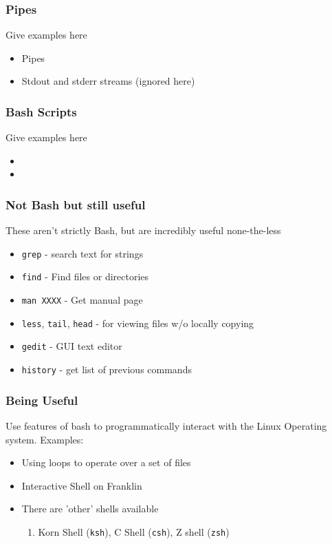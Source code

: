 \documentclass{beamer}
\newcommand{\code}[1]{\colorbox{codegray}{\texttt{#1}}}
\begin{document}
\begin{frame}
\frametitle{Pipes}
Give examples here
\begin{itemize}
    \item Pipes 
    \pause
    \item Stdout and stderr streams (ignored here)
    \pause
\end{itemize}
\end{frame}


\begin{frame}
\frametitle{Bash Scripts}
Give examples here
\begin{itemize}
    \item 
    \pause
    \item
    \pause
\end{itemize}
\end{frame}


\begin{frame}
\frametitle{Not Bash but still useful}
These aren't strictly Bash, but are incredibly useful none-the-less
\begin{itemize}
    \item \code{grep} - search text for strings
    \pause
    \item \code{find}   - Find files or directories
    \pause
    \item \code{man XXXX} - Get manual page
    \pause
    \item \code{less}, \code{tail}, \code{head} - for viewing files w/o locally copying
    \pause
    \item \code{gedit} - GUI text editor
    \pause
    \item \code{history} - get list of previous commands
    \pause
\end{itemize}
\end{frame}





\begin{frame}
\frametitle{Being Useful}
Use features of bash to programmatically interact with the Linux Operating system. Examples:
\begin{itemize}
    \item Using loops to operate over a set of files
    \pause
    \item Interactive Shell on Franklin
    \pause
    \item There are 'other' shells available
    \begin{enumerate}
        \item Korn Shell (\code{ksh}), C Shell (\code{csh}), Z shell (\code{zsh})
    \end{enumerate}
\end{itemize}
\end{frame}
\end{document}
